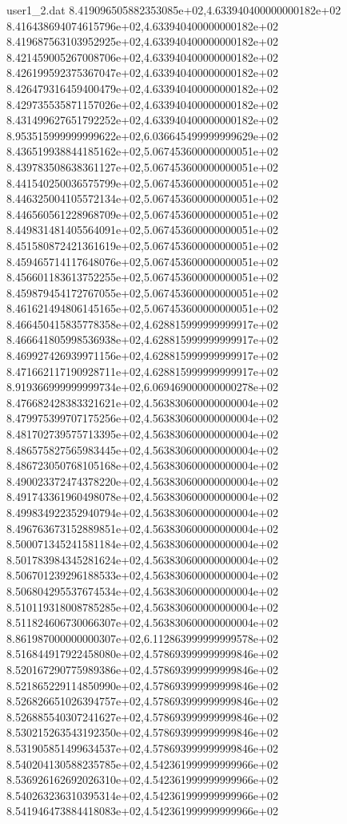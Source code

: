 \begin{filecontents}{user1_2.dat}
8.419096505882353085e+02,4.633940400000000182e+02
8.416438694074615796e+02,4.633940400000000182e+02
8.419687563103952925e+02,4.633940400000000182e+02
8.421459005267008706e+02,4.633940400000000182e+02
8.426199592375367047e+02,4.633940400000000182e+02
8.426479316459400479e+02,4.633940400000000182e+02
8.429735535871157026e+02,4.633940400000000182e+02
8.431499627651792252e+02,4.633940400000000182e+02
8.953515999999999622e+02,6.036645499999999629e+02
8.436519938844185162e+02,5.067453600000000051e+02
8.439783508638361127e+02,5.067453600000000051e+02
8.441540250036575799e+02,5.067453600000000051e+02
8.446325004105572134e+02,5.067453600000000051e+02
8.446560561228968709e+02,5.067453600000000051e+02
8.449831481405564091e+02,5.067453600000000051e+02
8.451580872421361619e+02,5.067453600000000051e+02
8.459465714117648076e+02,5.067453600000000051e+02
8.456601183613752255e+02,5.067453600000000051e+02
8.459879454172767055e+02,5.067453600000000051e+02
8.461621494806145165e+02,5.067453600000000051e+02
8.466450415835778358e+02,4.628815999999999917e+02
8.466641805998536938e+02,4.628815999999999917e+02
8.469927426939971156e+02,4.628815999999999917e+02
8.471662117190928711e+02,4.628815999999999917e+02
8.919366999999999734e+02,6.069469000000000278e+02
8.476682428383321621e+02,4.563830600000000004e+02
8.479975399707175256e+02,4.563830600000000004e+02
8.481702739575713395e+02,4.563830600000000004e+02
8.486575827565983445e+02,4.563830600000000004e+02
8.486723050768105168e+02,4.563830600000000004e+02
8.490023372474378220e+02,4.563830600000000004e+02
8.491743361960498078e+02,4.563830600000000004e+02
8.499834922352940794e+02,4.563830600000000004e+02
8.496763673152889851e+02,4.563830600000000004e+02
8.500071345241581184e+02,4.563830600000000004e+02
8.501783984345281624e+02,4.563830600000000004e+02
8.506701239296188533e+02,4.563830600000000004e+02
8.506804295537674534e+02,4.563830600000000004e+02
8.510119318008785285e+02,4.563830600000000004e+02
8.511824606730066307e+02,4.563830600000000004e+02
8.861987000000000307e+02,6.112863999999999578e+02
8.516844917922458080e+02,4.578693999999999846e+02
8.520167290775989386e+02,4.578693999999999846e+02
8.521865229114850990e+02,4.578693999999999846e+02
8.526826651026394757e+02,4.578693999999999846e+02
8.526885540307241627e+02,4.578693999999999846e+02
8.530215263543192350e+02,4.578693999999999846e+02
8.531905851499634537e+02,4.578693999999999846e+02
8.540204130588235785e+02,4.542361999999999966e+02
8.536926162692026310e+02,4.542361999999999966e+02
8.540263236310395314e+02,4.542361999999999966e+02
8.541946473884418083e+02,4.542361999999999966e+02

\end{filecontents}
